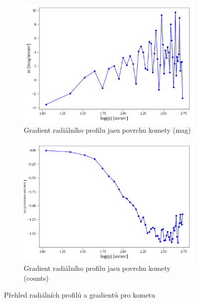 \documentclass[a4paper,11pt,twocolumn]{article}
\begin{document}
\begin{figure}
\begin{subfigure}[t]{0.48\textwidth}
            \centering
            \includegraphics[width=\textwidth]{grad.png}
            \caption{Gradient radiálního profilu jasu povrchu komety (mag)}
            \label{fig:grad}
        \end{subfigure}
        \hfill
        \begin{subfigure}[t]{0.48\textwidth}
            \centering
            \includegraphics[width=\textwidth]{grad_counts.png}
            \caption{Gradient radiálního profilu jasu povrchu komety (counts)}
            \label{fig:grad_counts}
        \end{subfigure}
        \caption{Přehled radiálních profilů a gradientů pro kometu}
        \label{fig:all_plots}
    \end{figure}
\end{document}
